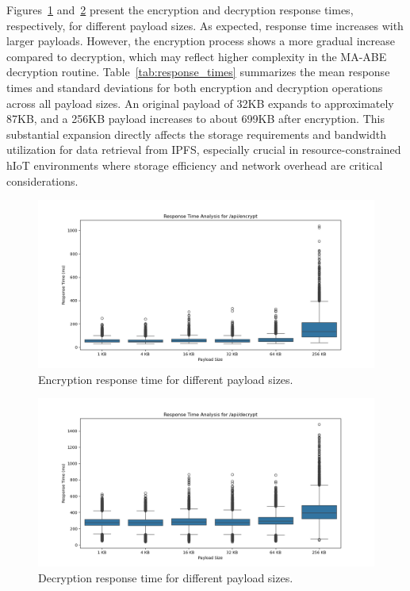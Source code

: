 \documentclass[cic,tc,english]{iiufrgs}
\numberwithin{algorithm}{chapter}
\begin{document}
            Figures~\ref{fig:encrypt_payload_size} and~\ref{fig:decrypt_payload_size} present the encryption and decryption response times, respectively, for different payload sizes. As expected, response time increases with larger payloads. However, the encryption process shows a more gradual increase compared to decryption, which may reflect higher complexity in the MA-ABE decryption routine. Table~\ref{tab:response_times} summarizes the mean response times and standard deviations for both encryption and decryption operations across all payload sizes. An original payload of 32KB expands to approximately 87KB, and a 256KB payload increases to about 699KB after encryption. This substantial expansion directly affects the storage requirements and bandwidth utilization for data retrieval from IPFS, especially crucial in resource-constrained hIoT environments where storage efficiency and network overhead are critical considerations. 
            

            \begin{figure}
                \centering
                \includegraphics[width=\textwidth]{images/phase2/response_time_api_encrypt.png}
                \caption{Encryption response time for different payload sizes.}
                \label{fig:encrypt_payload_size}
            \end{figure}

            \begin{figure}
                \centering
                \includegraphics[width=\textwidth]{images/phase2/response_time_api_decrypt.png}
                \caption{Decryption response time for different payload sizes.}
                \label{fig:decrypt_payload_size}
            \end{figure}
\end{document}
